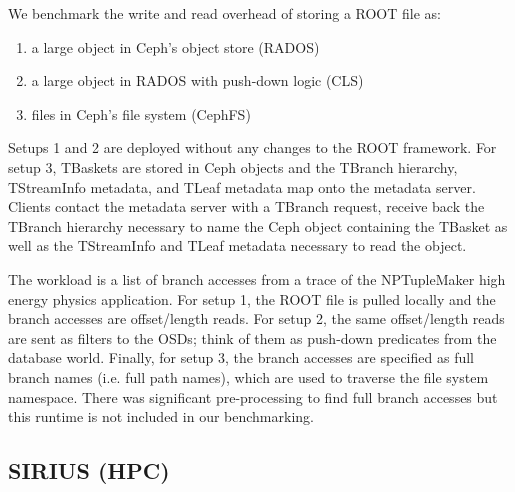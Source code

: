 We benchmark the write and read overhead of storing a ROOT file as:

\begin{enumerate}
  \item a large object in Ceph's object store (RADOS)
  \item a large object in RADOS with push-down logic (CLS)
  \item files in Ceph's file system (CephFS)
\end{enumerate}

Setups 1 and 2 are deployed without any changes to the ROOT framework. For
setup 3, TBaskets are stored in Ceph objects and the TBranch hierarchy,
TStreamInfo metadata, and TLeaf metadata map onto the metadata server.
Clients contact the metadata server with a TBranch request, receive back
the TBranch hierarchy necessary to name the Ceph object containing the TBasket
as well as the TStreamInfo and TLeaf metadata necessary to read the object. 

The workload is a list of branch accesses from a trace of the NPTupleMaker high
energy physics application. For setup 1, the ROOT file is pulled locally and
the branch accesses are offset/length reads. For setup 2, the same
offset/length reads are sent as filters to the OSDs; think of them as push-down
predicates from the database world. Finally, for setup 3, the branch accesses
are specified as full branch names (i.e. full path names), which are used to
traverse the file system namespace. There was significant pre-processing to
find full branch accesses but this runtime is not included in our benchmarking. 

\subsection{SIRIUS (HPC)}
